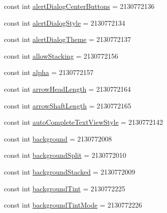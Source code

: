 \begin{DoxyCompactItemize}
\item 
const int \mbox{\hyperlink{class_f_w_p_s___app_1_1_droid_1_1_resource_1_1_attribute_aab541c3d6b054e79de2de1e3c2cd6f2b}{alert\+Dialog\+Center\+Buttons}} = 2130772136
\item 
const int \mbox{\hyperlink{class_f_w_p_s___app_1_1_droid_1_1_resource_1_1_attribute_a4ec9d0c63ee3c25321e4691b6b122103}{alert\+Dialog\+Style}} = 2130772134
\item 
const int \mbox{\hyperlink{class_f_w_p_s___app_1_1_droid_1_1_resource_1_1_attribute_a92025a011239cabe3201dbc8eecb5de8}{alert\+Dialog\+Theme}} = 2130772137
\item 
const int \mbox{\hyperlink{class_f_w_p_s___app_1_1_droid_1_1_resource_1_1_attribute_a835ad32c0d8b803626861acd4c093eb0}{allow\+Stacking}} = 2130772156
\item 
const int \mbox{\hyperlink{class_f_w_p_s___app_1_1_droid_1_1_resource_1_1_attribute_aae7d62f291b9cf467a1e3e268923b4c1}{alpha}} = 2130772157
\item 
const int \mbox{\hyperlink{class_f_w_p_s___app_1_1_droid_1_1_resource_1_1_attribute_a987b418b1fe2f4872651bf88f10af6a8}{arrow\+Head\+Length}} = 2130772164
\item 
const int \mbox{\hyperlink{class_f_w_p_s___app_1_1_droid_1_1_resource_1_1_attribute_a0daab46c7ebf3e50c47c176bb813fa24}{arrow\+Shaft\+Length}} = 2130772165
\item 
const int \mbox{\hyperlink{class_f_w_p_s___app_1_1_droid_1_1_resource_1_1_attribute_ab1c9558444074072a8811d6bb13da661}{auto\+Complete\+Text\+View\+Style}} = 2130772142
\item 
const int \mbox{\hyperlink{class_f_w_p_s___app_1_1_droid_1_1_resource_1_1_attribute_ad646d646c34268350f8cd99ce9385ea1}{background}} = 2130772008
\item 
const int \mbox{\hyperlink{class_f_w_p_s___app_1_1_droid_1_1_resource_1_1_attribute_a058182c6b48d83cc6d6d607c8631811c}{background\+Split}} = 2130772010
\item 
const int \mbox{\hyperlink{class_f_w_p_s___app_1_1_droid_1_1_resource_1_1_attribute_a707c445ba5d5280f03de378ab960c6c2}{background\+Stacked}} = 2130772009
\item 
const int \mbox{\hyperlink{class_f_w_p_s___app_1_1_droid_1_1_resource_1_1_attribute_a9f8d9b1a0a25a58ad57322887520a0ab}{background\+Tint}} = 2130772225
\item 
const int \mbox{\hyperlink{class_f_w_p_s___app_1_1_droid_1_1_resource_1_1_attribute_af401c695f79e342500713c22d73bae65}{background\+Tint\+Mode}} = 2130772226

\end{DoxyCompactItemize}
